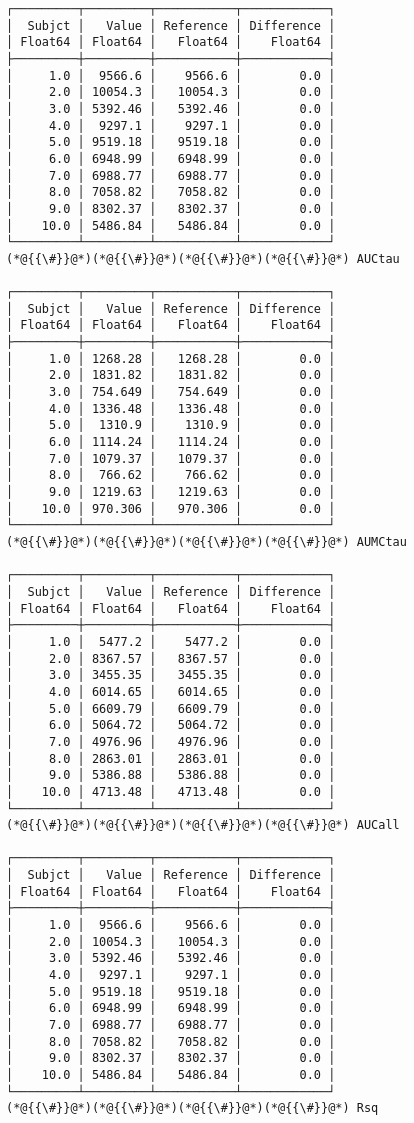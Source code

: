 \documentclass[12pt,a4paper]{article}
\begin{document}
\begin{lstlisting}
┌─────────┬─────────┬───────────┬────────────┐
│  Subjct │   Value │ Reference │ Difference │
│ Float64 │ Float64 │   Float64 │    Float64 │
├─────────┼─────────┼───────────┼────────────┤
│     1.0 │  9566.6 │    9566.6 │        0.0 │
│     2.0 │ 10054.3 │   10054.3 │        0.0 │
│     3.0 │ 5392.46 │   5392.46 │        0.0 │
│     4.0 │  9297.1 │    9297.1 │        0.0 │
│     5.0 │ 9519.18 │   9519.18 │        0.0 │
│     6.0 │ 6948.99 │   6948.99 │        0.0 │
│     7.0 │ 6988.77 │   6988.77 │        0.0 │
│     8.0 │ 7058.82 │   7058.82 │        0.0 │
│     9.0 │ 8302.37 │   8302.37 │        0.0 │
│    10.0 │ 5486.84 │   5486.84 │        0.0 │
└─────────┴─────────┴───────────┴────────────┘
(*@{{\#}}@*)(*@{{\#}}@*)(*@{{\#}}@*)(*@{{\#}}@*) AUCtau

┌─────────┬─────────┬───────────┬────────────┐
│  Subjct │   Value │ Reference │ Difference │
│ Float64 │ Float64 │   Float64 │    Float64 │
├─────────┼─────────┼───────────┼────────────┤
│     1.0 │ 1268.28 │   1268.28 │        0.0 │
│     2.0 │ 1831.82 │   1831.82 │        0.0 │
│     3.0 │ 754.649 │   754.649 │        0.0 │
│     4.0 │ 1336.48 │   1336.48 │        0.0 │
│     5.0 │  1310.9 │    1310.9 │        0.0 │
│     6.0 │ 1114.24 │   1114.24 │        0.0 │
│     7.0 │ 1079.37 │   1079.37 │        0.0 │
│     8.0 │  766.62 │    766.62 │        0.0 │
│     9.0 │ 1219.63 │   1219.63 │        0.0 │
│    10.0 │ 970.306 │   970.306 │        0.0 │
└─────────┴─────────┴───────────┴────────────┘
(*@{{\#}}@*)(*@{{\#}}@*)(*@{{\#}}@*)(*@{{\#}}@*) AUMCtau

┌─────────┬─────────┬───────────┬────────────┐
│  Subjct │   Value │ Reference │ Difference │
│ Float64 │ Float64 │   Float64 │    Float64 │
├─────────┼─────────┼───────────┼────────────┤
│     1.0 │  5477.2 │    5477.2 │        0.0 │
│     2.0 │ 8367.57 │   8367.57 │        0.0 │
│     3.0 │ 3455.35 │   3455.35 │        0.0 │
│     4.0 │ 6014.65 │   6014.65 │        0.0 │
│     5.0 │ 6609.79 │   6609.79 │        0.0 │
│     6.0 │ 5064.72 │   5064.72 │        0.0 │
│     7.0 │ 4976.96 │   4976.96 │        0.0 │
│     8.0 │ 2863.01 │   2863.01 │        0.0 │
│     9.0 │ 5386.88 │   5386.88 │        0.0 │
│    10.0 │ 4713.48 │   4713.48 │        0.0 │
└─────────┴─────────┴───────────┴────────────┘
(*@{{\#}}@*)(*@{{\#}}@*)(*@{{\#}}@*)(*@{{\#}}@*) AUCall

┌─────────┬─────────┬───────────┬────────────┐
│  Subjct │   Value │ Reference │ Difference │
│ Float64 │ Float64 │   Float64 │    Float64 │
├─────────┼─────────┼───────────┼────────────┤
│     1.0 │  9566.6 │    9566.6 │        0.0 │
│     2.0 │ 10054.3 │   10054.3 │        0.0 │
│     3.0 │ 5392.46 │   5392.46 │        0.0 │
│     4.0 │  9297.1 │    9297.1 │        0.0 │
│     5.0 │ 9519.18 │   9519.18 │        0.0 │
│     6.0 │ 6948.99 │   6948.99 │        0.0 │
│     7.0 │ 6988.77 │   6988.77 │        0.0 │
│     8.0 │ 7058.82 │   7058.82 │        0.0 │
│     9.0 │ 8302.37 │   8302.37 │        0.0 │
│    10.0 │ 5486.84 │   5486.84 │        0.0 │
└─────────┴─────────┴───────────┴────────────┘
(*@{{\#}}@*)(*@{{\#}}@*)(*@{{\#}}@*)(*@{{\#}}@*) Rsq


\end{lstlisting}
\end{document}
